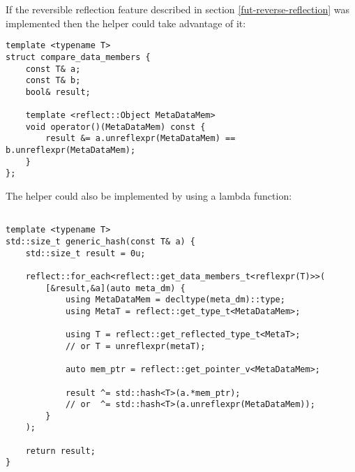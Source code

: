 If the reversible reflection feature described in section \ref{fut-reverse-reflection}
was implemented then the helper could take advantage of it:

\begin{verbatim}
template <typename T>
struct compare_data_members {
	const T& a;
	const T& b;
	bool& result;

	template <reflect::Object MetaDataMem>
	void operator()(MetaDataMem) const {
		result &= a.unreflexpr(MetaDataMem) == b.unreflexpr(MetaDataMem);
	}
};
\end{verbatim}

The helper could also be implemented by using a lambda function:

\begin{verbatim}

template <typename T>
std::size_t generic_hash(const T& a) {
	std::size_t result = 0u;

	reflect::for_each<reflect::get_data_members_t<reflexpr(T)>>(
		[&result,&a](auto meta_dm) {
			using MetaDataMem = decltype(meta_dm)::type;
			using MetaT = reflect::get_type_t<MetaDataMem>;

			using T = reflect::get_reflected_type_t<MetaT>;
			// or T = unreflexpr(metaT);

			auto mem_ptr = reflect::get_pointer_v<MetaDataMem>;

			result ^= std::hash<T>(a.*mem_ptr);
			// or  ^= std::hash<T>(a.unreflexpr(MetaDataMem));
		}
	);

	return result;
}
\end{verbatim}

